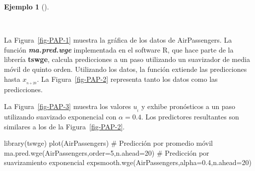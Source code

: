 \documentclass[
  us-letterpaper,
]{scrreprt}
\newenvironment{Shaded}{\begin{snugshade}}{\end{snugshade}}
\newcommand{\AttributeTok}[1]{\textcolor[rgb]{0.40,0.45,0.13}{#1}}
\newcommand{\CommentTok}[1]{\textcolor[rgb]{0.37,0.37,0.37}{#1}}
\newcommand{\DecValTok}[1]{\textcolor[rgb]{0.68,0.00,0.00}{#1}}
\newcommand{\FloatTok}[1]{\textcolor[rgb]{0.68,0.00,0.00}{#1}}
\newcommand{\FunctionTok}[1]{\textcolor[rgb]{0.28,0.35,0.67}{#1}}
\newcommand{\NormalTok}[1]{\textcolor[rgb]{0.00,0.23,0.31}{#1}}
\theoremstyle{plain}
\theoremstyle{definition}
\theoremstyle{definition}
\newtheorem{example}{Ejemplo}[chapter]
\theoremstyle{plain}
\theoremstyle{remark}
\begin{document}
\begin{example}[]\protect\hypertarget{exm-ppm}{}\label{exm-ppm}

~

\begin{tcolorbox}[enhanced jigsaw, breakable, colbacktitle=quarto-callout-caution-color!10!white, rightrule=.15mm, toptitle=1mm, colback=white, left=2mm, colframe=quarto-callout-caution-color-frame, bottomtitle=1mm, opacitybacktitle=0.6, leftrule=.75mm, arc=.35mm, title={Predicción por promedio móvil y suavizado exponencial de AirPassengers}, coltitle=black, titlerule=0mm, opacityback=0, bottomrule=.15mm, toprule=.15mm]

La Figura~\ref{fig-PAP-1} muestra la gráfica de los datos de
AirPassengers. La función \textbf{\emph{ma.pred.wge}} implementada en el
software R, que hace parte de la librería \textbf{tswge}, calcula
predicciones a un paso utilizando un suavizador de media móvil de quinto
orden. Utilizando los datos, la función extiende las predicciones hasta
\(x_{_{n+20}}\). La Figura~\ref{fig-PAP-2} representa tanto los datos
como las predicciones.

La Figura~\ref{fig-PAP-3} muestra los valores \(u_{_t}\) y exhibe
pronósticos a un paso utilizando suavizado exponencial con
\(\alpha = 0.4\). Los predictores resultantes son similares a los de la
Figura~\ref{fig-PAP-2}.

\begin{Shaded}
\begin{Highlighting}[]
\FunctionTok{library}\NormalTok{(tswge) }
\FunctionTok{plot}\NormalTok{(AirPassengers) }
\CommentTok{\# Predicción por promedio móvil }
\FunctionTok{ma.pred.wge}\NormalTok{(AirPassengers,}\AttributeTok{order=}\DecValTok{5}\NormalTok{,}\AttributeTok{n.ahead=}\DecValTok{20}\NormalTok{) }
\CommentTok{\# Predicción por suavizamiento exponencial }
\FunctionTok{expsmooth.wge}\NormalTok{(AirPassengers,}\AttributeTok{alpha=}\FloatTok{0.4}\NormalTok{,}\AttributeTok{n.ahead=}\DecValTok{20}\NormalTok{)}
\end{Highlighting}
\end{Shaded}

\begin{figure}[H]

\begin{minipage}{0.33\linewidth}

\centering{

}
\end{minipage}
\end{figure}
\end{tcolorbox}
\end{example}
\end{document}
